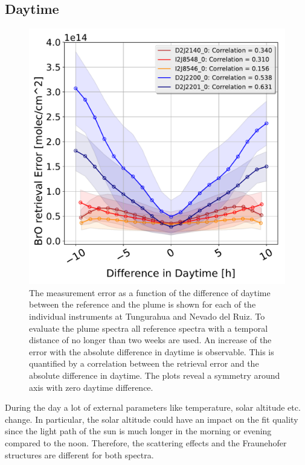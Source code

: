 \subsection{ Daytime \label{chap:daytime}}
	\begin{figure}
	\centering
	\includegraphics[width=0.7\linewidth]{Bilder/DiffDaytimeallInstruments}
	\caption{The  measurement error as a function of the difference of daytime between the reference and the plume is shown for each of the individual instruments at Tungurahua and Nevado del Ruiz. To evaluate the plume spectra all reference spectra with a temporal distance of no longer than two weeks are used. An increase of the  error with the absolute difference in daytime is observable. This is quantified by a correlation between the  retrieval error and the absolute difference in daytime. The plots reveal a symmetry around axis with zero daytime difference. }
	\label{fig:diffdaytime}
\end{figure}
During the day a lot of external parameters like temperature, solar altitude etc. change. In particular, the solar altitude could have an impact on the fit quality since the light path of the sun is much longer in the morning or evening compared to the noon. Therefore, the scattering effects and the Fraunehofer structures are different for both spectra.\\

